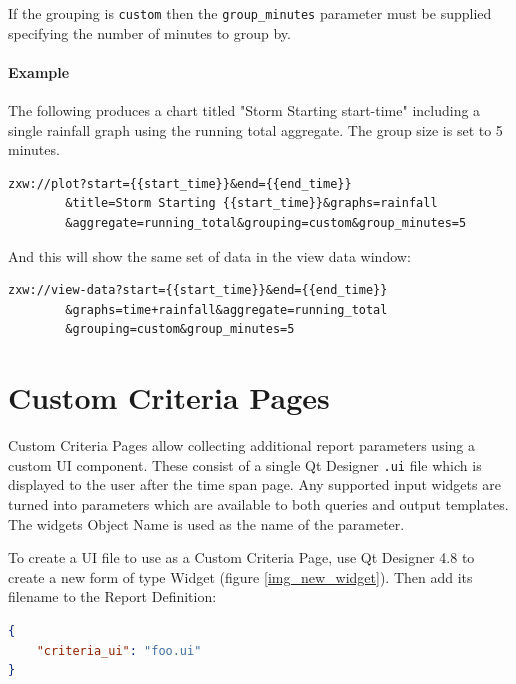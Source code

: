 \documentclass[a4paper,10pt]{book}
\begin{document}
If the grouping is \verb|custom| then the \verb|group_minutes| parameter must be supplied specifying the number of minutes to group by.

\subsubsection{Example}
The following produces a chart titled "Storm Starting start-time" including a single rainfall graph using the running total aggregate. The group size is set to 5 minutes.
\begin{verbatim}
zxw://plot?start={{start_time}}&end={{end_time}}
        &title=Storm Starting {{start_time}}&graphs=rainfall
        &aggregate=running_total&grouping=custom&group_minutes=5
\end{verbatim}

And this will show the same set of data in the view data window:
\begin{verbatim}
zxw://view-data?start={{start_time}}&end={{end_time}}
        &graphs=time+rainfall&aggregate=running_total
        &grouping=custom&group_minutes=5
\end{verbatim}

\chapter{Custom Criteria Pages}
Custom Criteria Pages allow collecting additional report parameters using a custom UI component. These consist of a single Qt Designer \verb|.ui| file which is displayed to the user after the time span page. Any supported input widgets are turned into parameters which are available to both queries and output templates. The widgets Object Name is used as the name of the parameter.

To create a UI file to use as a Custom Criteria Page, use Qt Designer 4.8 to create a new form of type Widget (figure \ref{img_new_widget}). Then add its filename to the Report Definition:

\begin{lstlisting}[language=json]
{
    "criteria_ui": "foo.ui"
}
\end{lstlisting}
\end{document}
